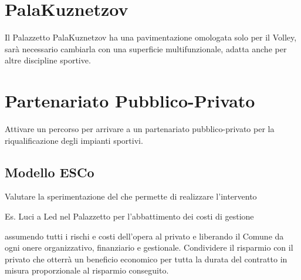 \documentclass[a4paper,14pt,italian]{sphinxmanual}
\begin{document}


\section{PalaKuznetzov}
\label{\detokenize{sport:palakuznetzov}}
Il Palazzetto PalaKuznetzov ha una pavimentazione omologata solo per il Volley, sarà necessario cambiarla con una superficie multifunzionale, adatta anche per altre discipline sportive.


\section{Partenariato Pubblico-Privato}
\label{\detokenize{sport:partenariato-pubblico-privato}}
Attivare un percorso per arrivare a un partenariato pubblico-privato per la riqualificazione degli impianti sportivi.


\subsection{Modello ESCo}
\label{\detokenize{sport:modello-esco}}
Valutare la sperimentazione del  che permette di realizzare l’intervento %
\begin{footnote}[4]\sphinxAtStartFootnote
Es. Luci a Led nel Palazzetto per l’abbattimento dei costi di gestione
%
\end{footnote} assumendo tutti i rischi e costi dell’opera al privato e liberando il Comune da ogni onere organizzativo, finanziario e gestionale.
Condividere il risparmio con il privato che otterrà un beneficio economico per tutta la durata del contratto in misura proporzionale al risparmio conseguito.
\end{document}
